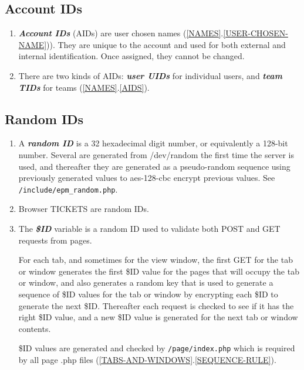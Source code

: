 \documentclass[12pt]{article}
\newcommand{\key}[1]{{\bf \em #1}}
\newcommand{\sref}[2]{(\ref{#1}.\ref{#2})}
\begin{document}
\subsection{Account IDs}

\begin{enumerate}
\item \key{Account IDs}
      (AIDs) are user chosen names \sref{NAMES}{USER-CHOSEN-NAME}).
      They are unique to the
      account and used for both external and internal identification.
      Once assigned, they cannot be changed.
\item There are two kinds of AIDs: \key{user UIDs} for individual users,
      and \key{team TIDs} for teams \sref{NAMES}{AIDS}.
\end{enumerate}

\subsection{Random IDs}

\begin{enumerate}
\item A \key{random ID} is a 32 hexadecimal digit number, or equivalently
      a 128-bit number.  Several are generated from /dev/random
      the first time the server is used, and thereafter they
      are generated as a pseudo-random sequence using previously
      generated values to aes-128-cbc encrypt previous values.
      See {\tt /include/epm\_random.php}.
\item Browser TICKETS are random IDs.
\item The \key{\$ID} variable is a random ID used to validate
      both POST and GET requests from pages.
      
      For each tab, and
      sometimes for the view window, the first GET for the tab
      or window generates the first \$ID value for the pages
      that will occupy the tab or window, and also generates
      a random key that is used to generate a sequence
      of \$ID values for the tab or window by encrypting
      each \$ID to generate the next \$ID.  Thereafter each
      request is checked to see if it has the right \$ID value,
      and a new \$ID value is generated for the next tab or
      window contents.

      \$ID values are generated and checked by {\tt /page/index.php}
      which is required by all page .php files
      \sref{TABS-AND-WINDOWS}{SEQUENCE-RULE}.
\end{enumerate}
\end{document}
